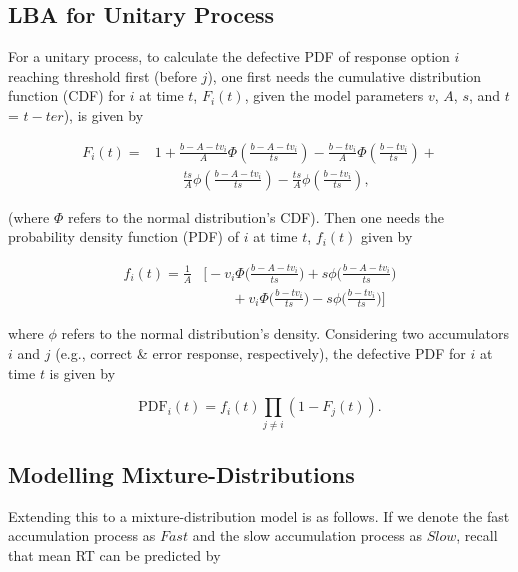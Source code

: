 \documentclass[a4paper, jou, natbib]{apa6}
\begin{document}
\subsection{LBA for Unitary Process}
For a unitary process, to calculate the defective PDF of response option $i$ reaching threshold first (before $j$), one first needs the cumulative distribution function (CDF) for $i$ at time $t$, $F_{i}(t)$, given the model parameters $v$, $A$, $s$, and $t$ = $t - ter$), is given by


\begin{equation}
\begin{aligned}
F_{i}(t) = & 1 + \frac{b - A - tv_{i}}{A} \Phi\left(\frac{b - A - tv_{i}}{ts}\right) - 
\frac{b - tv_{i}}{A} \Phi\left(\frac{b - tv_{i}}{ts}\right) + \\ 
&\qquad \frac{ts}{A} \phi \left(\frac{b - A - tv_{i}}{ts}\right) - \frac{ts}{A} \phi \left(\frac{b - tv_{i}}{ts}\right),
\end{aligned}
\label{eq:lbaCDF}
\end{equation}

\noindent (where $\Phi$ refers to the normal distribution's CDF). Then one needs the probability density function (PDF) of $i$ at time $t$, $f_{i}(t)$ given by  

\begin{equation}
\begin{aligned}
f_{i}(t) = \frac{1}{A} & \Biggl[-v_{i}\Phi \Biggl(\frac{b - A - tv_{i}}{ts}\Biggr) + s\phi\Biggl(\frac{b - A - tv_{i}}{ts}\Biggr) \\
&\qquad + v_{i}\Phi \Biggl(\frac{b - tv_{i}}{ts}\Biggr) - s\phi\Biggl(\frac{b - tv_{i}}{ts}\Biggr)\Biggr] 
\end{aligned}
\label{eq:lbaPDF}
\end{equation}

\noindent where $\phi$ refers to the normal distribution's density. Considering two accumulators $i$ and $j$ (e.g., correct \& error response, respectively), the defective PDF for $i$ at time $t$ is given by

\begin{equation}
\mbox{PDF}_{i}(t) = f_{i}(t) \prod_{j \neq i} \left(1 - F_{j}(t)\right).
\label{eq:defectivePDF}
\end{equation}


\subsection{Modelling Mixture-Distributions}
Extending this to a mixture-distribution model is as follows. If we denote the fast accumulation process as $Fast$ and the slow accumulation process as $Slow$, recall that mean RT can be predicted by
\end{document}
